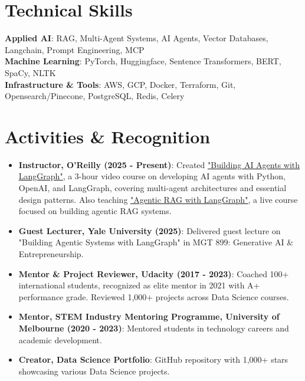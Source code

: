 \documentclass[letterpaper,11pt]{article}
\newcommand{\resumeItem}[1]{
  \item\small{
    {#1 \vspace{-2pt}}
  }
}
\newcommand{\resumeItemListStart}{\begin{itemize}}
\newcommand{\resumeItemListEnd}{\end{itemize}\vspace{-5pt}}
\begin{document}
\section{Technical Skills}
 \begin{itemize}[leftmargin=0.15in, label={}]
    \small{\item{
     \textbf{Applied AI}{: RAG, Multi-Agent Systems, AI Agents, Vector Databases, Langchain, Prompt Engineering, MCP} \\
     \textbf{Machine Learning}{: PyTorch, Huggingface, Sentence Transformers, BERT, SpaCy, NLTK} \\
     \textbf{Infrastructure \& Tools}{: AWS, GCP, Docker, Terraform, Git, Opensearch/Pinecone, PostgreSQL, Redis, Celery} \\
    }}
 \end{itemize}

\section{Activities \& Recognition}
\resumeItemListStart
  \resumeItem{\textbf{Instructor, O'Reilly (2025 - Present)}{: Created \href{https://learning.oreilly.com/course/building-ai-agents/0642572077884/}{\underline{"Building AI Agents with LangGraph"}}, a 3-hour video course on developing AI agents with Python, OpenAI, and LangGraph, covering multi-agent architectures and essential design patterns. Also teaching \href{https://learning.oreilly.com/live-events/agentic-rag-with-langgraph/0642572176174/}{\underline{"Agentic RAG with LangGraph"}}, a live course focused on building agentic RAG systems.} \\}
  \resumeItem{\textbf{Guest Lecturer, Yale University (2025)}{: Delivered guest lecture on "Building Agentic Systems with LangGraph" in MGT 899: Generative AI \& Entrepreneurship.} \\}
  \resumeItem{\textbf{Mentor \& Project Reviewer, Udacity (2017 - 2023)}{: Coached 100+ international students, recognized as elite mentor in 2021 with A+ performance grade. Reviewed 1,000+ projects across Data Science courses.} \\}
  \resumeItem{\textbf{Mentor, STEM Industry Mentoring Programme, University of Melbourne (2020 - 2023)}{: Mentored students in technology careers and academic development.} \\}
  \resumeItem{\textbf{Creator, Data Science Portfolio}{: GitHub repository with 1,000+ stars showcasing various Data Science projects.} \\}
\resumeItemListEnd
\end{document}
